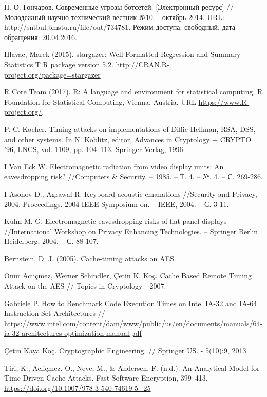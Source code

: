\begingroup
\renewcommand{\section}[2]{\anonsection{Библиографический список}}
\begin{thebibliography}{00}

    Н. О. Гончаров.
    Современные угрозы ботсетей. [Электронный ресурс] // Молодежный научно-технический вестник №10. - октябрь 2014.
    URL: http://sntbul.bmstu.ru/file/out/734781.
    Режим доступа: свободный, дата обращения: 20.04.2016.

  Hlavac, Marek (2015). stargazer: Well-Formatted Regression and Summary Statistics T
  R package version 5.2. \url{http://CRAN.R-project.org/package=stargazer}

  R Core Team (2017). R: A language and environment for statistical
  computing. R Foundation for Statistical Computing, Vienna, Austria.
  URL \url{https://www.R-project.org/}.

  P. C. Kocher. Timing attacks on implementations of Diffie-Hellman, RSA,
  DSS, and other systems. In N. Koblitz, editor, Advances in Cryptology −
  CRYPTO ’96, LNCS, vol. 1109, pp. 104–113. Springer-Verlag, 1996.

I  Van Eck W. Electromagnetic radiation from video display units: An eavesdropping risk? //Computers \& Security. – 1985. – Т. 4. – №. 4. – С. 269-286.

I  Asonov D., Agrawal R. Keyboard acoustic emanations //Security and Privacy, 2004. Proceedings. 2004 IEEE Symposium on. – IEEE, 2004. – С. 3-11.

  Kuhn M. G. Electromagnetic eavesdropping risks of flat-panel displays //International Workshop on Privacy Enhancing Technologies. – Springer Berlin Heidelberg, 2004. – С. 88-107.

  Bernstein, D. J. (2005). Cache-timing attacks on AES.

  Onur Acıiçmez, Werner Schindler, Çetin K. Koç.
  Cache Based Remote Timing Attack on the AES //
  Topics in Cryptology - 2007.

  Gabriele P. How to Benchmark Code Execution Times on Intel IA-32 and IA-64 Instruction Set Architectures //
  \url{https://www.intel.com/content/dam/www/public/us/en/documents/manuals/64-ia-32-architectures-optimization-manual.pdf}

  Çetin Kaya Koç.
  Cryptographic Engineering. //
  Springer US. - 5(10):9, 2013.

  Tiri, K., Acıiçmez, O., Neve, M., \& Andersen, F. (n.d.).
  An Analytical Model for Time-Driven Cache Attacks.
  Fast Software Encryption, 399–413. \url{https://doi.org/10.1007/978-3-540-74619-5_25}



\end{thebibliography}
\endgroup

\clearpage
